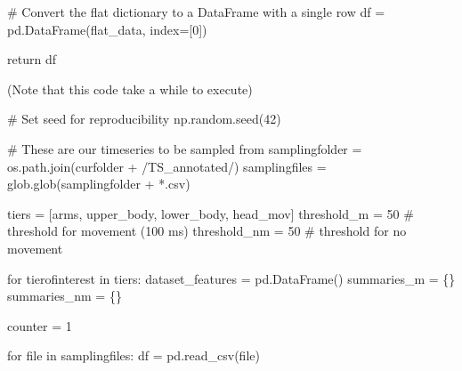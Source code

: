 \documentclass[
  letterpaper,
  DIV=11,
  numbers=noendperiod]{scrreprt}
\newenvironment{Shaded}{\begin{snugshade}}{\end{snugshade}}
\newcommand{\BuiltInTok}[1]{\textcolor[rgb]{0.00,0.23,0.31}{#1}}
\newcommand{\CommentTok}[1]{\textcolor[rgb]{0.37,0.37,0.37}{#1}}
\newcommand{\ControlFlowTok}[1]{\textcolor[rgb]{0.00,0.23,0.31}{#1}}
\newcommand{\DecValTok}[1]{\textcolor[rgb]{0.68,0.00,0.00}{#1}}
\newcommand{\KeywordTok}[1]{\textcolor[rgb]{0.00,0.23,0.31}{#1}}
\newcommand{\NormalTok}[1]{\textcolor[rgb]{0.00,0.23,0.31}{#1}}
\newcommand{\OperatorTok}[1]{\textcolor[rgb]{0.37,0.37,0.37}{#1}}
\newcommand{\StringTok}[1]{\textcolor[rgb]{0.13,0.47,0.30}{#1}}
\begin{document}
\begin{Shaded}
\begin{Highlighting}[]
    \CommentTok{\# Convert the flat dictionary to a DataFrame with a single row}
\NormalTok{    df }\OperatorTok{=}\NormalTok{ pd.DataFrame(flat\_data, index}\OperatorTok{=}\NormalTok{[}\DecValTok{0}\NormalTok{])}
    
    \ControlFlowTok{return}\NormalTok{ df}
\end{Highlighting}
\end{Shaded}

(Note that this code take a while to execute)

\begin{Shaded}
\begin{Highlighting}[]
\CommentTok{\# Set seed for reproducibility}
\NormalTok{np.random.seed(}\DecValTok{42}\NormalTok{)}

\CommentTok{\# These are our timeseries to be sampled from}
\NormalTok{samplingfolder }\OperatorTok{=}\NormalTok{ os.path.join(curfolder }\OperatorTok{+} \StringTok{\textquotesingle{}/TS\_annotated/\textquotesingle{}}\NormalTok{)}
\NormalTok{samplingfiles }\OperatorTok{=}\NormalTok{ glob.glob(samplingfolder }\OperatorTok{+} \StringTok{\textquotesingle{}*.csv\textquotesingle{}}\NormalTok{)}

\NormalTok{tiers }\OperatorTok{=}\NormalTok{ [}\StringTok{\textquotesingle{}arms\textquotesingle{}}\NormalTok{, }\StringTok{\textquotesingle{}upper\_body\textquotesingle{}}\NormalTok{, }\StringTok{\textquotesingle{}lower\_body\textquotesingle{}}\NormalTok{, }\StringTok{\textquotesingle{}head\_mov\textquotesingle{}}\NormalTok{]}
\NormalTok{threshold\_m }\OperatorTok{=} \DecValTok{50} \CommentTok{\# threshold for movement (100 ms)}
\NormalTok{threshold\_nm }\OperatorTok{=} \DecValTok{50} \CommentTok{\# threshold for no movement}

\ControlFlowTok{for}\NormalTok{ tierofinterest }\KeywordTok{in}\NormalTok{ tiers:}
\NormalTok{    dataset\_features }\OperatorTok{=}\NormalTok{ pd.DataFrame()}
\NormalTok{    summaries\_m }\OperatorTok{=}\NormalTok{ \{\}}
\NormalTok{    summaries\_nm }\OperatorTok{=}\NormalTok{ \{\}}

\NormalTok{    counter }\OperatorTok{=} \DecValTok{1}

    \ControlFlowTok{for} \BuiltInTok{file} \KeywordTok{in}\NormalTok{ samplingfiles:}
\NormalTok{        df }\OperatorTok{=}\NormalTok{ pd.read\_csv(}\BuiltInTok{file}\NormalTok{)}


\end{Highlighting}
\end{Shaded}
\end{document}
